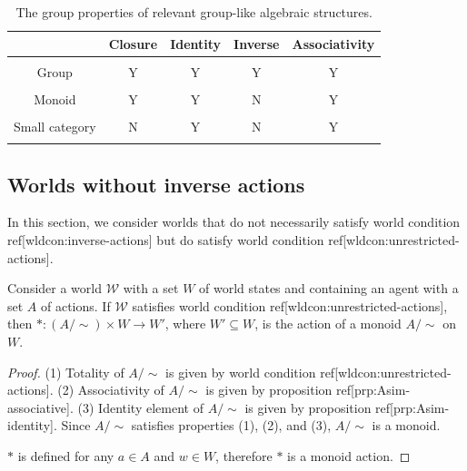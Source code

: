 \begin{table}[H]
    \centering
    \begin{tabular}{c|c|c|c|c}
                        & Closure   & Identity & Inverse  & Associativity \\
                        \hline
                        &           &          &          & \\
        Group           & Y         & Y        & Y        & Y \\
                        &           &          &          & \\
        Monoid          & Y         & Y        & N        & Y \\
                        &           &          &          & \\
        Small category  & N         & Y        & N        & Y \\
                        &           &          &          & \\
    \end{tabular}
    \caption{The group properties of relevant group-like algebraic structures.}
    \label{tab:group-like-algebraic-structures}
\end{table}

\subsection{Worlds without inverse actions}

In this section, we consider worlds that do not necessarily satisfy world condition ref[wldcon:inverse-actions] but do satisfy world condition ref[wldcon:unrestricted-actions].

\begin{proposition}\label{prp:wc1_gives_monoid_action}
    Consider a world $\mathscr{W}$ with a set $W$ of world states and containing an agent with a set $A$ of actions.
    If $\mathscr{W}$ satisfies world condition ref[wldcon:unrestricted-actions], then $*: (A/\sim) \times W \to W'$, where $W' \subseteq W$, is the action of a monoid $A/\sim$ on $W$.
\end{proposition}
\begin{proof}
    (1) Totality of $A/\sim$ is given by world condition ref[wldcon:unrestricted-actions].
    (2) Associativity of $A/\sim$ is given by proposition ref[prp:Asim-associative].
    (3) Identity element of $A/\sim$ is given by proposition ref[prp:Asim-identity].
    Since $A/\sim$ satisfies properties (1), (2), and (3), $A/\sim$ is a monoid.
    
    $*$ is defined for any $a \in A$ and $w \in W$, therefore $*$ is a monoid action.
\end{proof}

